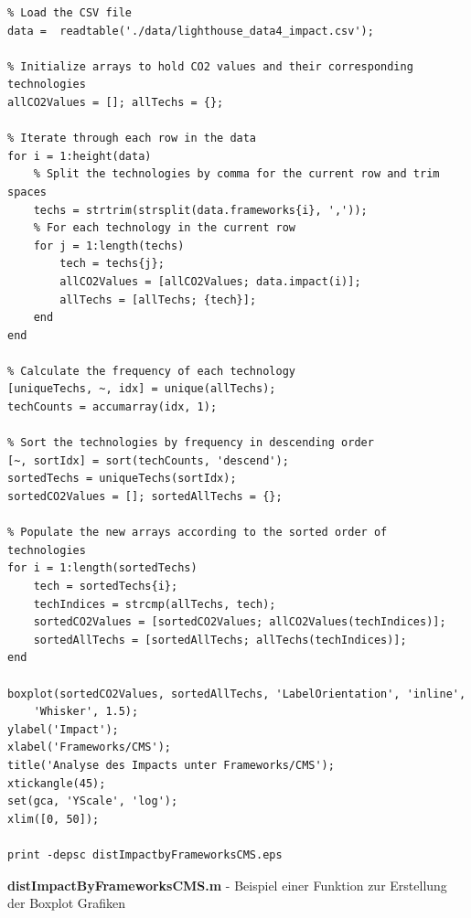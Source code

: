 \documentclass[Bachelor,BIF,german,IEEE]{BASE/twbook}
\begin{document}
\begin{listing}[htbp]
\begin{verbatim}
% Load the CSV file
data =  readtable('./data/lighthouse_data4_impact.csv');

% Initialize arrays to hold CO2 values and their corresponding technologies
allCO2Values = []; allTechs = {};

% Iterate through each row in the data
for i = 1:height(data)
    % Split the technologies by comma for the current row and trim spaces
    techs = strtrim(strsplit(data.frameworks{i}, ','));
    % For each technology in the current row
    for j = 1:length(techs)
        tech = techs{j};
        allCO2Values = [allCO2Values; data.impact(i)];
        allTechs = [allTechs; {tech}];
    end
end

% Calculate the frequency of each technology
[uniqueTechs, ~, idx] = unique(allTechs);
techCounts = accumarray(idx, 1);

% Sort the technologies by frequency in descending order
[~, sortIdx] = sort(techCounts, 'descend');
sortedTechs = uniqueTechs(sortIdx);
sortedCO2Values = []; sortedAllTechs = {};

% Populate the new arrays according to the sorted order of technologies
for i = 1:length(sortedTechs)
    tech = sortedTechs{i};
    techIndices = strcmp(allTechs, tech);
    sortedCO2Values = [sortedCO2Values; allCO2Values(techIndices)];
    sortedAllTechs = [sortedAllTechs; allTechs(techIndices)];
end

boxplot(sortedCO2Values, sortedAllTechs, 'LabelOrientation', 'inline', 
    'Whisker', 1.5);
ylabel('Impact');
xlabel('Frameworks/CMS');
title('Analyse des Impacts unter Frameworks/CMS');
xtickangle(45);
set(gca, 'YScale', 'log');
xlim([0, 50]);

print -depsc distImpactbyFrameworksCMS.eps
\end{verbatim}
\caption{\textbf{distImpactByFrameworksCMS.m} - Beispiel einer Funktion zur Erstellung der Boxplot Grafiken}
\end{listing}
\end{document}
